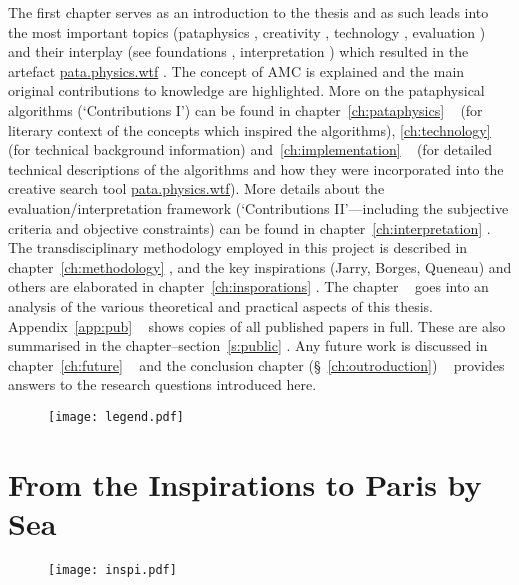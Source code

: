 \documentclass[11pt]{thesis} %
\begin{document}
{\sffamily 

The first chapter serves as an introduction to the thesis and as such leads into the most important topics (pataphysics \pata, creativity \creat, technology \tech, evaluation \eval) and their interplay (see foundations \found, interpretation \inter) which resulted in the artefact \url{pata.physics.wtf} \imple. The concept of \acf{AMC} is explained and the main original contributions to knowledge are highlighted. More on the pataphysical algorithms (`Contributions I') can be found in chapter~\ref{ch:pataphysics} \pata~ (for literary context of the concepts which inspired the algorithms), \ref{ch:technology} \tech~ (for technical background information) and~\ref{ch:implementation} \imple~ (for detailed technical descriptions of the algorithms and how they were incorporated into the creative search tool \url{pata.physics.wtf}). More details about the evaluation/interpretation framework (`Contributions II'---including the subjective criteria and objective constraints) can be found in chapter~\ref{ch:interpretation} \inter. The transdisciplinary methodology employed in this project is described in chapter~\ref{ch:methodology} \metho, and the key inspirations (Jarry, Borges, Queneau) and others are elaborated in chapter~\ref{ch:insporations} \inspi. The  chapter \anal~ goes into an analysis of the various theoretical and practical aspects of this thesis. Appendix~\ref{app:pub} \appe~ shows copies of all published papers in full. These are also summarised in the  chapter--section~\ref{s:public} \appli. Any future work is discussed in chapter~\ref{ch:future} \aspi~ and the conclusion chapter (§~\ref{ch:outroduction}) \outro~ provides answers to the research questions introduced here.
}

\begin{figure}[!htbp]
\centering
  \texttt{[image: legend.pdf]}
\end{figure}



\newpage
\section{From the Inspirations to Paris by Sea}

\vspace{1cm}
\begin{figure}[!htbp]
\centering
  \texttt{[image: inspi.pdf]}
\end{figure}
\end{document}
